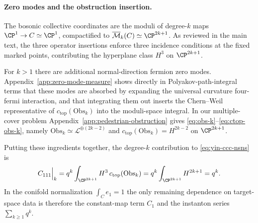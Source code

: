 \documentclass[12pt]{article}
\begin{document}
\paragraph{Zero modes and the obstruction insertion.}
The bosonic collective coordinates are the moduli of degree-$k$ maps
$\CP^1\to C\simeq\CP^1$, compactified to
$\overline{\mathcal{M}}_k(C)\simeq\CP^{2k+1}$. As reviewed in the main text,
the three operator insertions enforce three incidence conditions at the fixed
marked points, contributing the hyperplane class $H^3$ on $\CP^{2k+1}$.

For $k>1$ there are additional normal-direction fermion zero modes.
Appendix~\ref{app:zero-mode-measure} shows directly in Polyakov-path-integral
terms that these modes are absorbed by expanding the universal curvature
four-fermi interaction, and that integrating them out inserts the
Chern--Weil representative of $c_{\mathrm{top}}(\mathrm{Obs}_k)$ into the
moduli-space integral. In our multiple-cover problem
Appendix~\ref{app:pedestrian-obstruction} gives \eqref{eq:obs-k}--\eqref{eq:ctop-obs-k},
namely $\mathrm{Obs}_k\simeq\mathcal{L}^{\oplus(2k-2)}$ and
$c_{\mathrm{top}}(\mathrm{Obs}_k)=H^{2k-2}$ on $\CP^{2k+1}$.

Putting these ingredients together, the degree-$k$ contribution to
\eqref{eq:yin-ccc-nsns} is
\begin{equation}
  C_{111}\Big|_{k}
  =
  q^k
  \int_{\CP^{2k+1}} H^3\,c_{\mathrm{top}}(\mathrm{Obs}_k)
  =
  q^k\int_{\CP^{2k+1}} H^{2k+1}
  =
  q^k.
  \label{eq:uv-k-result}
\end{equation}
In the conifold normalization $\int_C e_1=1$ the only remaining dependence on
target-space data is therefore the constant-map term $C_1$ and the instanton
series $\sum_{k\ge1}q^k$.
\end{document}
